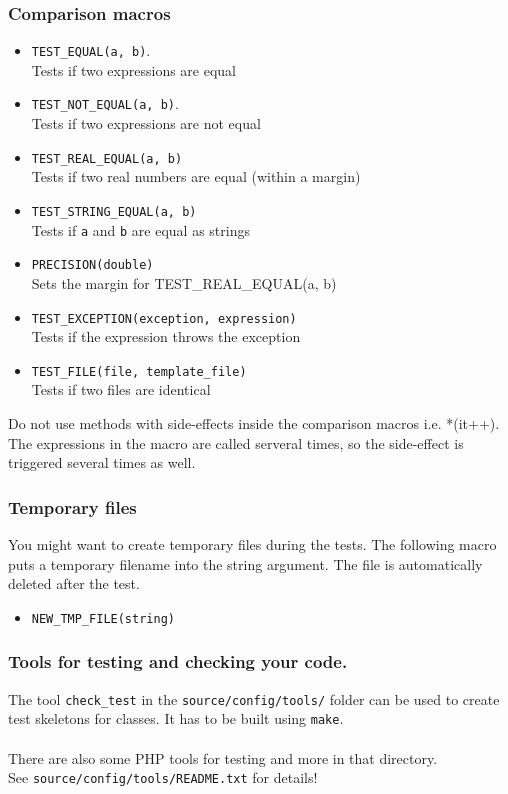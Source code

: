 \documentclass[a4]{article}
\begin{document}
\subsubsection{Comparison macros}
\begin{itemize}
        \item {\tt TEST\_EQUAL(a, b)}.\\ Tests if two expressions are equal
        \item {\tt TEST\_NOT\_EQUAL(a, b)}.\\ Tests if two expressions are not equal
        \item {\tt TEST\_REAL\_EQUAL(a, b)} \\ Tests if two real numbers are equal (within a margin)
        \item {\tt TEST\_STRING\_EQUAL(a, b)} \\ Tests if \texttt a and \texttt b are equal as strings
        \item {\tt PRECISION(double)} \\ Sets the margin for TEST\_REAL\_EQUAL(a, b)
        \item {\tt TEST\_EXCEPTION(exception, expression)} \\ Tests if the expression throws the exception
        \item {\tt TEST\_FILE(file, template\_file)} \\ Tests if two files are identical
\end{itemize}
Do not use methods with side-effects inside the comparison macros i.e. *(it++). The expressions
in the macro are called serveral times, so the side-effect is triggered several times as well. 

\subsubsection{Temporary files}
You might want to create temporary files during the tests. The following macro 
puts a temporary filename into the string argument. The file is automatically deleted
after the test.
\begin{itemize}
        \item {\tt NEW\_TMP\_FILE(string)}
\end{itemize}

\subsubsection{Tools for testing and checking your code.}
The tool {\tt check\_test} in the {\tt source/config/tools/} folder can be used to
create test skeletons for classes. It has to be built using {\tt make}.\\
\\
There are also some PHP tools for testing and more in that directory.\\
See {\tt source/config/tools/README.txt} for details!
\end{document}
